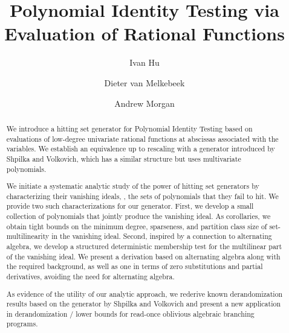 \documentclass{toc}
\begin{document}
\begin{frontmatter}%

%
%
%

%
\title{Polynomial Identity Testing via \\ Evaluation of Rational Functions
    }  %

%
%

%
%
%
%
%
%

%
%
%
%
%
%
%
%
%
%
%
%


%
%
%
%

%

\author[hu]{Ivan Hu}
\author[vanmelkebeek]{Dieter van Melkebeek}
\author[morgan]{Andrew Morgan}

%
%
%
%

%
%
%
%
%
%
%
%
\begin{abstract}
We introduce a hitting set generator for Polynomial Identity Testing based on evaluations of low-degree univariate rational functions at abscissas associated with the variables. We establish an equivalence up to rescaling with a generator introduced by Shpilka and Volkovich, which has a similar structure but uses multivariate polynomials.

We initiate a systematic analytic study of the power of hitting set generators by characterizing their vanishing ideals, \ie, the sets of polynomials that they fail to hit. We provide two such characterizations for our generator. 
First, we develop a small collection of polynomials that jointly produce the vanishing ideal. As corollaries, we obtain tight bounds on the minimum degree, sparseness, and partition class size of set-multilinearity in the vanishing ideal.
Second, inspired by a connection to alternating algebra, we develop a structured deterministic membership test for the multilinear part of the vanishing ideal. We present a derivation based on alternating algebra along with the required background, as well as one in terms of zero substitutions and partial derivatives, avoiding the need for alternating algebra.
 
As evidence of the utility of our analytic approach, we rederive known derandomization results based on the generator by Shpilka and Volkovich and present a new application in derandomization / lower bounds for read-once oblivious algebraic branching programs.
\end{abstract}

%

\end{frontmatter}
\end{document}
